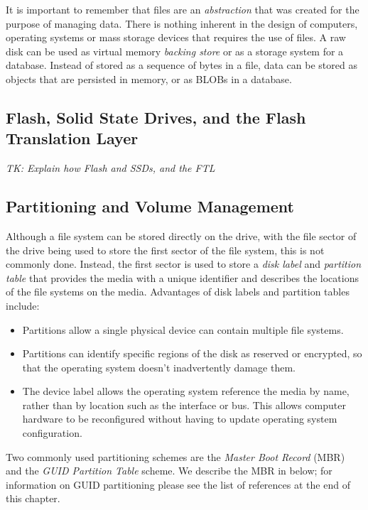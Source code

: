 It is important to remember that files are an \emph{abstraction} that
was created for the purpose of managing data. There is nothing
inherent in the design of computers, operating systems or mass storage
devices that requires the use of files. A raw disk can be used as
virtual memory \emph{backing store} or as a storage system for a
database. Instead of stored as a sequence of bytes in a file, data can be stored as
objects that are persisted in memory, or as BLOBs in a database.


\subsection{Flash, Solid State Drives, and the Flash Translation Layer}

\emph{TK: Explain how Flash and SSDs, and the FTL}

\subsection{Partitioning and Volume Management}

Although a file system can be stored directly on the drive, with the
file sector of the drive being used to store the first sector of the
file system, this is not commonly done. Instead, the first 
sector is used to store a \emph{disk label} and  \emph{partition
  table} that provides the media with a unique identifier and describes the
locations of the file systems on the media. Advantages of disk labels
and partition tables include:
\begin{itemize}
\item Partitions allow a single physical device can contain multiple file systems.
\item Partitions can identify specific regions of the disk as reserved
  or encrypted, so that the operating system doesn't inadvertently
  damage them.
\item The device label allows the operating system reference the media
  by name, rather than by location such as the interface or bus. This
  allows computer hardware to be reconfigured without having to update
  operating system configuration.
\end{itemize}

Two commonly used partitioning schemes are the \emph{Master Boot
  Record} (MBR) and the \emph{GUID Partition Table} scheme. We
describe the MBR in  below; for information on GUID
partitioning please see the list of references at the end of this
chapter.


